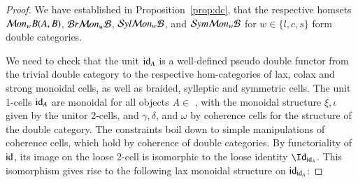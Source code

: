 \begin{proof}
We have established in Proposition~\ref{prop:dc}, that the respective homsets $\mathcal{M} on_wB(A,B)$, $\mathcal{B} r \mathcal{M} on_w\mathcal{B}$, $\mathcal{S} yl \mathcal{M} on_w\mathcal{B}$, and $\mathcal{S} ym \mathcal{M} on_w\mathcal{B}$ for $w \in \{l,c,s\}$ form double categories. 

We need to check that the unit $\mathrm{id}_A$ is a well-defined pseudo double functor from the trivial double category to the respective hom-categories of lax, colax and strong monoidal cells, as well as braided, sylleptic and symmetric cells. 
The unit 1-cells $\mathrm{id}_A$ are monoidal for all objects $A \in$ \fB,  with the monoidal structure $\xi, \iota$ given by the unitor 2-cells, and $\gamma, \delta$, and $\omega$ by coherence cells for the structure of the double category. The constraints boil down to simple manipulations of coherence cells, which hold by coherence of double categories. By functoriality of $\mathrm{id}$, its image on the loose 2-cell  is isomorphic to the loose identity $\looseid_{\transid_A}$. This isomorphism gives rise to the following lax monoidal structure on $\mathrm{id}_{\mathrm{id}_A}$: 


\end{proof}
